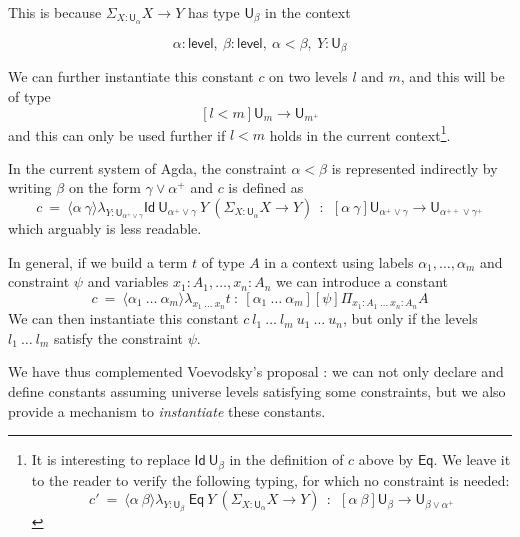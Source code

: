 \documentclass[11pt,a4paper]{article}
\theoremstyle{definition}
\newcommand{\Id}{\mathsf{Id}}
\newcommand{\Eq}{\mathsf{Eq}}
\newcommand{\UU}{\mathsf{U}}
\newcommand{\Level}{\mathsf{level}}
\newcommand{\lam}[1]{{\langle}#1{\rangle}}
\begin{document}
   This is because $\Sigma_{X:\UU_{\alpha}}X\rightarrow Y$ has type $\UU_{\beta}$ in the context

   $$\alpha:\Level,~\beta:\Level,~\alpha<\beta,~Y:\UU_{\beta}$$

   We can further instantiate this constant $c$ on two levels $l$ and $m$, and this will be of type
   $$[l<m]\UU_{m} \rightarrow \UU_{m^+}$$
   and this can only be used further if $l<m$ holds in the current
   context\footnote{It is interesting to replace $\Id~\UU_\beta$ in the
   definition of
$c$ above by $\Eq$. We leave it to the reader to verify the
following typing, for which no constraint is needed:
$$
c'~=~\lam{\alpha~\beta}\lambda_{Y:\UU_{\beta}}~\Eq~Y~ (\Sigma_{X:\UU_{\alpha}}X\rightarrow Y)~~:~~
   [\alpha~\beta]\UU_{\beta} \rightarrow \UU_{\beta\vee\alpha^+}
$$}.

\medskip


In the current system of Agda, the constraint $\alpha<\beta$ is represented indirectly by
writing $\beta$ on the form $\gamma\vee \alpha^+$ and $c$ is defined as
$$
c~=~\lam{\alpha~\gamma}\lambda_{Y:\UU_{\alpha^+\vee\gamma}}\Id~{\UU_{\alpha^+\vee\gamma}}~Y~ (\Sigma_{X:\UU_{\alpha}}X\rightarrow Y)~~:~~
   [\alpha~\gamma]\UU_{\alpha^+\vee\gamma} \rightarrow \UU_{\alpha^{++}\vee\gamma^+}
$$
   which arguably is less readable.

\medskip

In general, if we  build a term $t$ of type $A$ in a context using labels $\alpha_1,\dots,\alpha_m$
and constraint $\psi$ and variables $x_1:A_1,\dots,x_n:A_n$ we can introduce a constant
$$
c~=~ \lam{\alpha_1~\dots~\alpha_m}\lambda_{x_1~\dots~x_n}t ~:~
[\alpha_1~\dots~\alpha_m][\psi]\Pi_{x_1:A_1~\dots~x_n:A_n}A
$$
We can then instantiate this constant $c~l_1~\dots~l_m~u_1~\dots~u_n$, but only if the levels
$l_1~\dots~l_m$ satisfy the constraint $\psi$.

    We have thus complemented Voevodsky's proposal \cite{VV}: we can not only declare and define
    constants assuming universe levels satisfying some constraints, but we also provide a mechanism
    to {\em instantiate} these constants.


\end{document}
